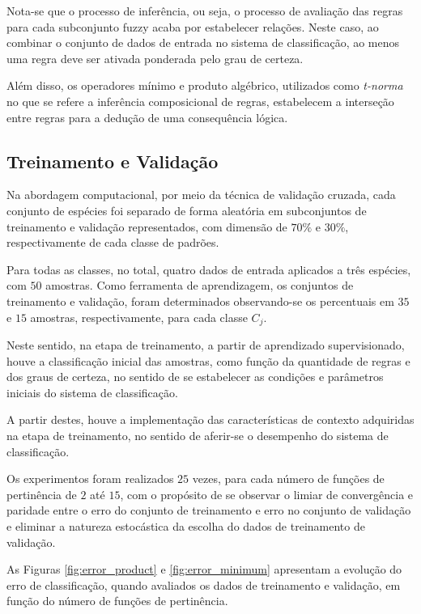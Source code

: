 \documentclass[12pt,a4paper]{article}
\numberwithin{equation}{section}
\begin{document}
Nota-se que o processo de inferência, ou seja, o processo de avaliação das regras para cada subconjunto fuzzy acaba por estabelecer relações. Neste caso, ao combinar o conjunto de dados de entrada no sistema de classificação, ao menos uma regra deve ser ativada ponderada pelo grau de certeza.

Além disso, os operadores mínimo e produto algébrico, utilizados como \textit{t-norma} no que se refere a inferência composicional de regras, estabelecem a interseção entre regras para a dedução de uma consequência lógica.

\subsection{Treinamento e Validação}
\label{subsection:training}

Na abordagem computacional, por meio da técnica de validação cruzada, cada conjunto de espécies foi separado de forma aleatória em subconjuntos de treinamento e validação representados, com dimensão de $70\%$ e $30\%$, respectivamente de cada classe de padrões.

Para todas as classes, no total, quatro dados de entrada aplicados a três espécies, com $50$ amostras. Como ferramenta de aprendizagem, os conjuntos de treinamento e validação, foram determinados observando-se os percentuais em $35$ e $15$ amostras, respectivamente, para cada classe $C_{j}$.

Neste sentido, na etapa de treinamento, a partir de aprendizado supervisionado, houve a classificação inicial das amostras, como função da quantidade de regras e dos graus de certeza, no sentido de se estabelecer as condições e parâmetros iniciais do sistema de classificação.

A partir destes, houve a implementação das características de contexto adquiridas na etapa de treinamento, no sentido de aferir-se o desempenho do sistema de classificação.

Os experimentos foram realizados $25$ vezes, para cada número de funções de pertinência de $2$ até $15$, com o propósito de se observar o limiar de convergência e paridade entre o erro do conjunto de treinamento e erro no conjunto de validação e eliminar a natureza estocástica da escolha do dados de treinamento de validação.

As Figuras \ref{fig:error_product} e \ref{fig:error_minimum} apresentam a evolução do erro de classificação, quando avaliados os dados de treinamento e validação, em função do número de funções de pertinência.
\end{document}
